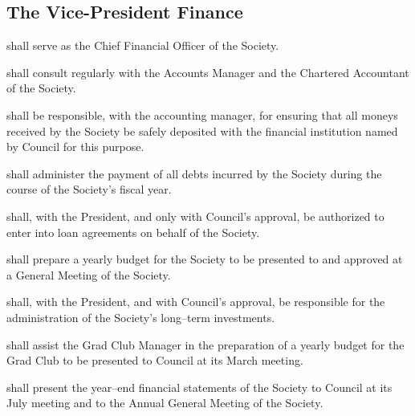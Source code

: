 \subsection {The Vice-President Finance} 
\begin{longenum}[ label*=\thesubsection.\arabic*., align=left]
	\item shall serve as the Chief Financial Officer of the Society.
    \item shall consult regularly with the Accounts Manager and the Chartered Accountant of the Society.
    \item shall be responsible, with the accounting manager, for ensuring that all moneys received by the Society be safely deposited with the financial institution named by Council for this purpose.
    \item shall administer the payment of all debts incurred by the Society during the course of the Society's fiscal year.
    \item shall, with the President, and only with Council's approval, be authorized to enter into loan agreements on behalf of the Society. 
    \item shall prepare a yearly budget for the Society to be presented to and approved at a General Meeting of the Society.
    \item shall, with the President, and with Council's approval, be responsible for the administration of the Society's long--term investments.
    \item shall assist the Grad Club Manager in the preparation of a yearly budget for the Grad Club to be presented to Council at its March meeting. 
    \item shall present the year--end financial statements of the Society to Council at its July meeting and to the Annual General Meeting of the Society.

\end{longenum}
